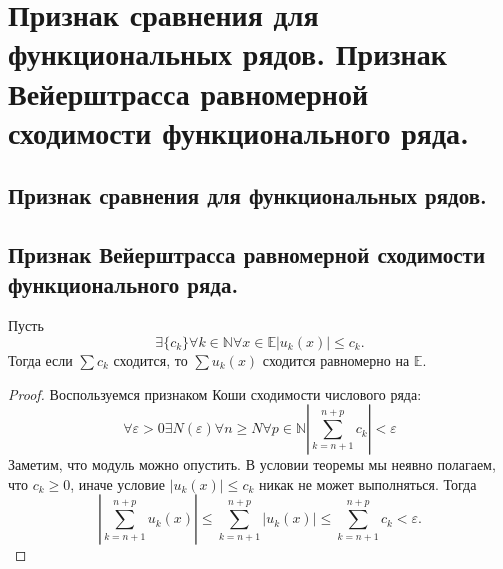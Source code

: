 \section{Признак сравнения для функциональных рядов. Признак Вейерштрасса равномерной сходимости функционального ряда.}

\subsection{Признак сравнения для функциональных рядов.}


\subsection{Признак Вейерштрасса равномерной сходимости функционального ряда.}
\begin{theorem}
    Пусть
    \[
        \exists \{c_k\}
        \forall k \in \mathbb{N}
        \forall x \in \mathbb{E}
        |u_k(x)| \leqslant c_k.
    \]
    Тогда если $\sum c_k$ сходится, то $\sum u_k(x)$ сходится равномерно на $\mathbb{E}$.
    \begin{proof}
        Воспользуемся признаком Коши сходимости числового ряда:
        \[
            \forall \varepsilon > 0
            \exists N(\varepsilon)
            \forall n \geqslant N
            \forall p \in \mathbb{N}
            \left|
                \sum_{k=n+1}^{n+p} c_k
            \right| < \varepsilon
        \]
        Заметим, что модуль можно опустить. В условии теоремы мы неявно полагаем, что $c_k \geqslant 0$, иначе условие $|u_k(x)| \leqslant c_k$ никак не может выполняться. Тогда
        \[
            \left|
                \sum_{k=n+1}^{n+p} u_k(x)
            \right| \leqslant
            \sum_{k=n+1}^{n+p} |u_k(x)|
            \leqslant
            \sum_{k=n+1}^{n+p} c_k < \varepsilon.
        \]
    \end{proof}
\end{theorem}